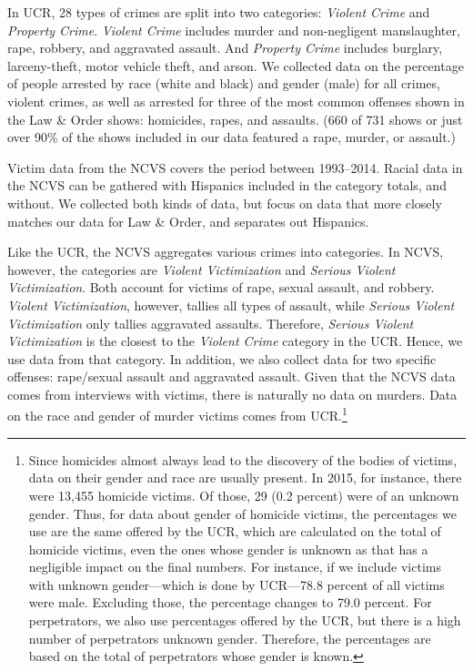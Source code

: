 \documentclass[12pt, letterpaper]{article}
\begin{document}
In UCR, 28 types of crimes are split into two categories: \textit{Violent Crime} and \textit{Property Crime}. \textit{Violent Crime} includes murder and non-negligent manslaughter, rape, robbery, and aggravated assault. And \textit{Property Crime} includes burglary, larceny-theft, motor vehicle theft, and arson. We collected data on the percentage of people arrested by race (white and black) and gender (male) for all crimes, violent crimes, as well as arrested for three of the most common offenses shown in the Law \& Order shows: homicides, rapes, and assaults. (660 of 731 shows or just over 90\% of the shows included in our data featured a rape, murder, or assault.)

Victim data from the NCVS covers the period between 1993--2014. Racial data in the NCVS can be gathered with Hispanics included in the category totals, and without. We collected both kinds of data, but focus on data that more closely matches our data for Law \& Order, and separates out Hispanics.

Like the UCR, the NCVS aggregates various crimes into categories. In NCVS, however, the categories are \textit{Violent Victimization} and \textit{Serious Violent Victimization}. Both account for victims of rape, sexual assault, and robbery. \textit{Violent Victimization}, however, tallies all types of assault, while \textit{Serious Violent Victimization} only tallies aggravated assaults. Therefore, \textit{Serious Violent Victimization} is the closest to the \textit{Violent Crime} category in the UCR. Hence, we use data from that category. In addition, we also collect data for two specific offenses: rape/sexual assault and aggravated assault. Given that the NCVS data comes from interviews with victims, there is naturally no data on murders. Data on the race and gender of murder victims comes from UCR.\footnote{Since homicides almost always lead to the discovery of the bodies of victims, data on their gender and race are usually present. In 2015, for instance, there were 13,455 homicide victims. Of those, 29 (0.2 percent) were of an unknown gender. Thus, for data about gender of homicide victims, the percentages we use are the same offered by the UCR, which are calculated on the total of homicide victims, even the ones whose gender is unknown as that has a negligible impact on the final numbers. For instance, if we include victims with unknown gender---which is done by UCR---78.8 percent of all victims were male. Excluding those, the percentage changes to 79.0 percent. For perpetrators, we also use percentages offered by the UCR, but there is a high number of perpetrators unknown gender. Therefore, the percentages are based on the total of perpetrators whose gender is known.}
\end{document}
